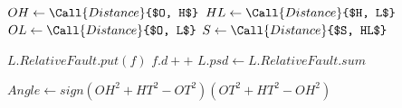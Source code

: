 \documentclass[journal]{IEEEtran}
\begin{document}
\begin{appendix}
\begin{algorithm}
\begin{algorithmic}[1]
				\State $OH \gets \Call{Distance}{$O, H$}$
				\State $HL \gets \Call{Distance}{$H, L$}$
				\State $OL \gets \Call{Distance}{$O, L$}$
				\State $S \gets \Call{Distance}{$S, HL$}$
				
				

					\State $L.RelativeFault.put(f)$
				  	\State $f.d  ++$				 				
				\EndIf
			\EndFor 
					\State $L.psd \gets L.RelativeFault.sum$
			\EndFor 
		\EndFor
		    \State {} 
		\EndIf
		
		\State $Angle \gets sign(OH^2+HT^2-OT^2) (OT^2+HT^2-OH^2) $
		 \State {}
		\Else
			\State {}      
		\EndIf
		\EndFunction
            \EndFunction
             
           
            
        \end{algorithmic}
    \end{algorithm}

\end{appendix}  


%
%
%


% 
\end{document}
